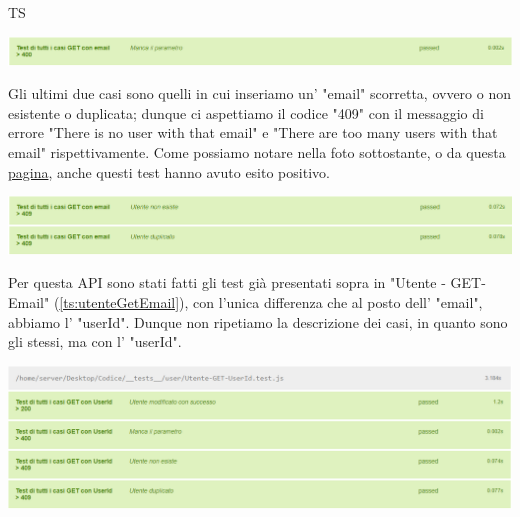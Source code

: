 \begin{listaPersonale}{TS}
                \begin{center}
                        \includegraphics[width=1\textwidth, height=0.04\textheight]{img/png/tests/UtenteGet_email/400_missingParameter_getUtente_email.png}
                \end{center}
                Gli ultimi due casi sono quelli in cui inseriamo un' "email" scorretta, ovvero o non esistente o duplicata; dunque ci aspettiamo il codice "409" con il messaggio di errore "There is no user with that email" e "There are too many users with that email" rispettivamente. Come possiamo notare nella foto sottostante, o da questa \href{https://plan-it.it/test-report.html} {pagina}, anche questi test hanno avuto esito positivo.
                \begin{center}
                        \includegraphics[width=1\textwidth, height=0.08\textheight]{img/png/tests/UtenteGet_email/409_userId_getUtente_email.png}
                \end{center}
                Per questa API sono stati fatti gli test già presentati sopra in "Utente - GET-Email" (\ref{ts:utenteGetEmail}), con l'unica differenza che al posto dell' "email", abbiamo l' "userId". Dunque non ripetiamo la descrizione dei casi, in quanto sono gli stessi, ma con l' "userId".
                \begin{center}
                        \includegraphics[width=1\textwidth, height=0.2\textheight]{img/png/tests/UtenteGet_userId/getUtente_userId.png}
                \end{center}
\end{listaPersonale}
